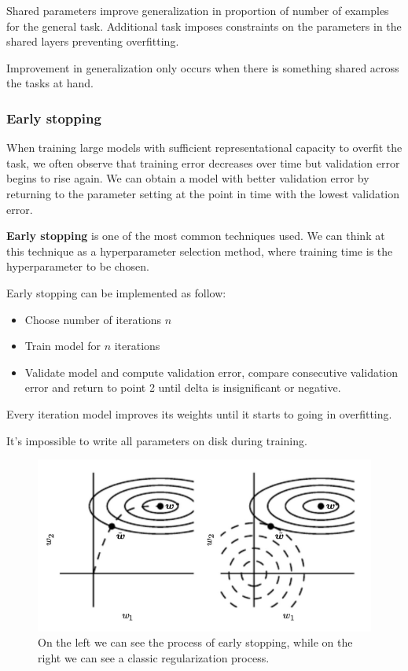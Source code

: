 Shared parameters improve generalization in proportion of number of examples for
the general task. Additional task imposes constraints on the parameters in the
shared layers preventing overfitting.
\begin{note}
    Improvement in generalization only occurs when there is something shared across
    the tasks at hand.
\end{note}
\subsubsection{Early stopping}
When training large models with sufficient representational capacity to overfit
the task, we often observe that training error decreases over time but validation
error begins to rise again. We can obtain a model with better validation error by
returning to the parameter setting at the point in time with the lowest validation
error.

\textbf{Early stopping} is one of the most common techniques used. We can think
at this technique as a hyperparameter selection method, where training time is
the hyperparameter to be chosen.

Early stopping can be implemented as follow:
\begin{itemize}
    \item Choose number of iterations $n$
    \item Train model for $n$ iterations
    \item Validate model and compute validation error, compare consecutive validation
          error and return to point 2 until delta is insignificant or negative.
\end{itemize}
Every iteration model improves its weights until it starts to going in overfitting.
\begin{note}
    It's impossible to write all parameters on disk during training.
\end{note}
\begin{figure}[!ht]
    \centering
    \includegraphics[width=1\textwidth]{img/early_stopping.png}
    \caption{On the left we can see the process of early stopping, while on the
        right we can see a classic regularization process.}
    \label{fig:earlystopping}
\end{figure}
